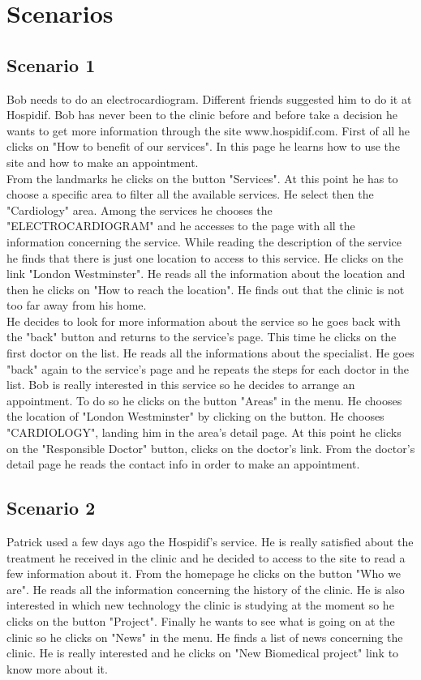 \documentclass{../Common/Structure/doc_pdf}
\begin{document}
\chapter{Scenarios}
\thispagestyle{fancy}
\section{Scenario 1}
Bob needs to do an electrocardiogram. Different friends suggested him to do it at Hospidif. Bob has never been to the clinic before and before take a decision he wants to get more information through the site www.hospidif.com.
First of all he clicks on "How to benefit of our services". In this page he learns how to use the site and how to make an appointment.\\From the landmarks he clicks on the button "Services". At this point he has to choose a specific area to filter all the available services.
He select then the "Cardiology" area. Among the services he chooses the "ELECTROCARDIOGRAM" and he accesses to the page with all the information concerning the service. While reading the description of the service he finds that there is just one location to access to this service. He clicks on the link "London Westminster". He reads all the information about the location and then he clicks on "How to reach the location". He finds out that the clinic is not too far away from his home.\\He decides to look for more information about the service so he goes back with the "back" button and returns to the service's page.
This time he clicks on the first doctor on the list. He reads all the informations about the specialist. He goes "back" again to the service's page and he repeats the steps for each doctor in the list. Bob is really interested in this service so he decides to arrange an appointment. To do so he clicks on the button "Areas" in the menu. He chooses the location of "London Westminster" by clicking on the button. He chooses "CARDIOLOGY", landing him in the area's detail page. At this point he clicks on the "Responsible Doctor" button, clicks on the doctor's link. From the doctor's detail page he reads the contact info in order to make an appointment. 

\newpage

\section{Scenario 2}
Patrick used a few days ago the Hospidif's service. He is really satisfied about the treatment he received in the clinic and he decided to access to the site to read a few information about it. From the homepage he clicks on the button "Who we are". He reads all the information concerning the history of the clinic. He is also interested in which new technology the clinic is studying at the moment so he clicks on the button "Project". Finally he wants to see what is going on at the clinic so he clicks on "News" in the menu. He finds a list of news concerning the clinic. He is really interested and he clicks on "New Biomedical project" link to know more about it.
\end{document}
